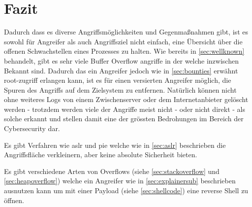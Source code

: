 \pagebreak

\section{Fazit}
Dadurch dass es diverse Angriffsmöglichkeiten und Gegenmaßnahmen gibt,
ist es sowohl für Angreifer als auch Angriffsziel nicht einfach,
eine Übersicht über die offenen Schwachstellen eines Prozesses zu halten.
Wie bereits in \autoref{sec:wellknown} behandelt, gibt es sehr viele Buffer Overflow
angriffe in der welche inzwischen Bekannt sind. Dadurch das ein Angreifer jedoch
wie in \autoref{sec:bounties} erwähnt root-zugriff erlangen kann, ist es für einen
versierten Angreifer möglich, die Spuren des Angriffs auf dem Zielsystem zu
entfernen. Natürlich können nicht ohne weiteres Logs von einem Zwischenserver
oder dem Internetanbieter gelöscht werden - trotzdem werden viele der Angriffe
meist nicht - oder nicht direkt - als solche erkannt und stellen damit eine der
grössten Bedrohungen im Bereich der Cybersecurity dar.

Es gibt Verfahren wie \acrlong{aslr} und \acrlong{pie} welche wie in \autoref{sec:aslr}
beschrieben die Angriffsfläche verkleinern, aber keine absolute Sicherheit bieten.

Es gibt verschiedene Arten von Overflows (siehe \autoref{sec:stackoverflow} und \ref*{sec:heapoverflow})
welche ein Angreifer wie in \autoref{sec:explainersub} beschrieben ausnutzen kann um
mit einer Payload (siehe \autoref{sec:shellcode}) eine reverse Shell zu öffnen.




















